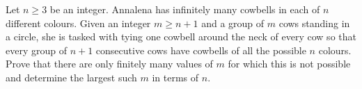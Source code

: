 Let $n\geq 3$ be an integer.
Annalena has infinitely many cowbells in each of $n$ different colours.
Given an integer $m \ge n+1$ and a group of $m$ cows standing in a circle,
she is tasked with tying one cowbell around the neck of every cow so that
every group of $n+1$ consecutive cows have cowbells of all the possible $n$ colours.
Prove that there are only finitely many values of $m$ for which this is not possible
and determine the largest such $m$ in terms of $n$.
